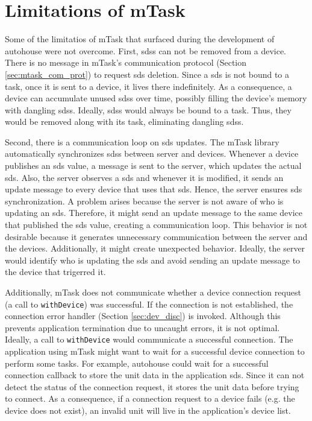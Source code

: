 \section{Limitations of mTask}\label{sec:limitations}
Some of the limitatios of \gls{mTask} that surfaced during the development of \gls{autohouse} were not overcome. First, \acsp{sds} can not be removed from a device. There is no message in \gls{mTask}'s communication protocol (Section \ref{sec:mtask_com_prot}) to request \acs{sds} deletion. Since a \acs{sds} is not bound to a task, once it is sent to a device, it lives there indefinitely. As a consequence, a device can accumulate unused \acsp{sds} over time, possibly filling the device's memory with dangling \acsp{sds}. Ideally, \acsp{sds} would always be bound to a task. Thus, they would be removed along with its task, eliminating dangling \acsp{sds}. 

Second, there is a communication loop on \acs{sds} updates. The \gls{mTask} library automatically synchronizes \acsp{sds} between server and devices. Whenever a device publishes an \ac{sds} value, a message is sent to the server, which updates the actual \acs{sds}. Also, the server observes a \acs{sds} and whenever it is modified, it sends an update message to every device that uses that \acs{sds}. Hence, the server ensures \acs{sds} synchronization. A problem arises because the server is not aware of who is updating an \ac{sds}. Therefore, it might send an update message to the same device that published the \ac{sds} value, creating a communication loop. This behavior is not desirable because it generates unnecessary communication between the server and the devices. Additionally, it might create unexpected behavior. Ideally, the server would identify who is updating the \acs{sds} and avoid sending an update message to the device that trigerred it.

Additionally, \gls{mTask} does not communicate whether a device connection request (a call to \texttt{withDevice}) was successful. If the connection is not established, the connection error handler (Section \ref{sec:dev_disc}) is invoked. Although this prevents application termination due to uncaught errors, it is not optimal. Ideally, a call to \texttt{withDevice} would communicate a successful connection. The application using \gls{mTask} might want to wait for a successful device connection to perform some tasks. For example, \gls{autohouse} could wait for a successful connection callback to store the unit data in the application \acs{sds}. Since it can not detect the status of the connection request, it stores the unit data before trying to connect. As a consequence, if a connection request to a device fails (e.g. the device does not exist), an invalid unit will live in the application's device list. 

